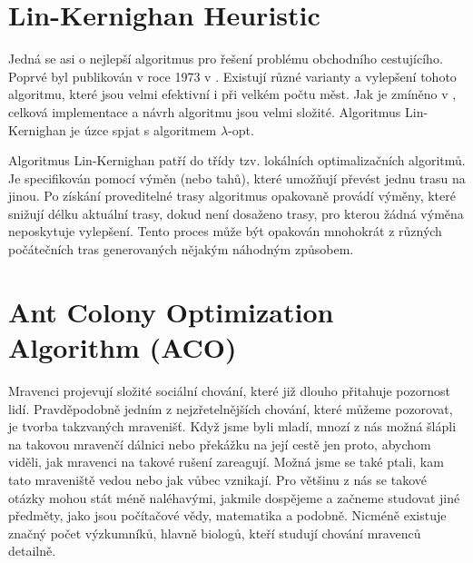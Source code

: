 \section{Lin-Kernighan Heuristic}
Jedná se asi o nejlepší algoritmus pro řešení problému obchodního cestujícího. Poprvé byl publikován v roce 1973 v \cite{LinKernighan1973}. Existují různé varianty a vylepšení tohoto algoritmu, které jsou velmi efektivní i při velkém počtu měst. Jak je zmíněno v \cite{helsgaun2000effective}, celková implementace a návrh algoritmu jsou velmi složité. Algoritmus Lin-Kernighan je úzce spjat s algoritmem $\lambda$-opt.

Algoritmus Lin-Kernighan patří do třídy tzv. lokálních optimalizačních algoritmů. Je specifikován pomocí výměn (nebo tahů), které umožňují převést jednu trasu na jinou. Po získání proveditelné trasy algoritmus opakovaně provádí výměny, které snižují délku aktuální trasy, dokud není dosaženo trasy, pro kterou žádná výměna neposkytuje vylepšení. Tento proces může být opakován mnohokrát z různých počátečních tras generovaných nějakým náhodným způsobem.

 











\section{Ant Colony Optimization Algorithm (ACO)} 
Mravenci projevují složité sociální chování, které již dlouho přitahuje pozornost lidí. Pravděpodobně jedním z nejzřetelnějších chování, které můžeme pozorovat, je tvorba takzvaných mravenišť. Když jsme byli mladí, mnozí z nás možná šlápli na takovou mravenčí dálnici nebo překážku na její cestě jen proto, abychom viděli, jak mravenci na takové rušení zareagují. Možná jsme se také ptali, kam tato mraveniště vedou nebo jak vůbec vznikají. Pro většinu z nás se takové otázky mohou stát méně naléhavými, jakmile dospějeme a začneme studovat jiné předměty, jako jsou počítačové vědy, matematika a podobně. Nicméně existuje značný počet výzkumníků, hlavně biologů, kteří studují chování mravenců detailně.

